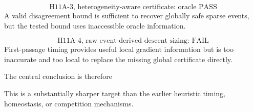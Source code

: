 \begin{equation}
  \boxed{\text{H11A-3, heterogeneity-aware certificate: oracle PASS}}
\end{equation}
A valid disagreement bound is sufficient to recover globally safe sparse events, but the tested bound uses inaccessible oracle information.

\begin{equation}
  \boxed{\text{H11A-4, raw event-derived descent sizing: FAIL}}
\end{equation}
First-passage timing provides useful local gradient information but is too inaccurate and too local to replace the missing global certificate directly.

The central conclusion is therefore
\begin{center}
\end{center}
This is a substantially sharper target than the earlier heuristic timing, homeostasis, or competition mechanisms.
